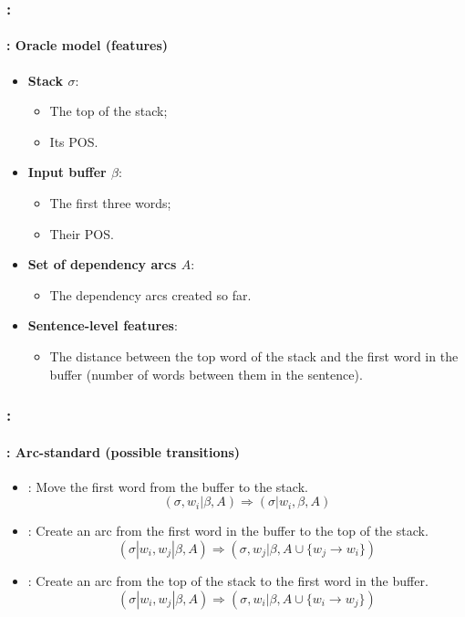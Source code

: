 \documentclass[xcolor=table]{beamer}
\begin{document}
\begin{frame}
	\frametitle{\insertshortsubtitle: \insertsection}
	\framesubtitle{\insertsubsection: Oracle model (features)}

	\begin{itemize}
		\item \textbf{Stack $\sigma$}:
		\begin{itemize}
			\item The top of the stack;
			\item Its POS.
		\end{itemize}
	
		\item \textbf{Input buffer $\beta$}:
		\begin{itemize}
			\item The first three words;
			\item Their POS.
		\end{itemize}
	
		\item \textbf{Set of dependency arcs $A$}:
		\begin{itemize}
			\item The dependency arcs created so far.
		\end{itemize}
	
		\item \textbf{Sentence-level features}:
		\begin{itemize}
			\item The distance between the top word of the stack and the first word in the buffer (number of words between them in the sentence).
		\end{itemize}
	
	\end{itemize}

\end{frame}

\begin{frame}
	\frametitle{\insertshortsubtitle: \insertsection}
	\framesubtitle{\insertsubsection: Arc-standard (possible transitions)}

	\begin{itemize}
		\item {}: Move the first word from the buffer to the stack.
		\[ (\sigma, w_i|\beta, A) \Rightarrow  (\sigma|w_i, \beta, A) \]
		
		\item {}: Create an arc from the first word in the buffer to the top of the stack.
		\[ (\sigma|w_i, w_j|\beta, A) \Rightarrow  (\sigma, w_j|\beta, A \cup \{w_j \rightarrow w_i \}) \] 
		
		\item {}: Create an arc from the top of the stack to the first word in the buffer.
		\[ (\sigma|w_i, w_j|\beta, A) \Rightarrow  (\sigma, w_i|\beta, A \cup \{w_i \rightarrow w_j \}) \] 
	\end{itemize}

\end{frame}
\end{document}
